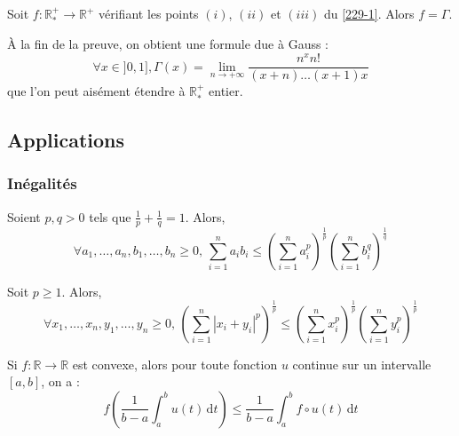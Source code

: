 
	\begin{theorem}
		Soit $f : \mathbb{R}^+_* \rightarrow \mathbb{R}^+$ vérifiant les points $(i)$, $(ii)$ et $(iii)$ du \cref{229-1}. Alors $f = \Gamma$.
	\end{theorem}

	\begin{remark}
		À la fin de la preuve, on obtient une formule due à Gauss :
		\[ \forall x \in ]0, 1], \Gamma(x) = \lim_{n \rightarrow +\infty} \frac{n^x n!}{(x+n) \dots (x+1)x} \]
		que l'on peut aisément étendre à $\mathbb{R}^+_*$ entier.
	\end{remark}

	\subsection{Applications}

	\subsubsection{Inégalités}


	\begin{proposition}
		Soient $p, q > 0$ tels que $\frac{1}{p} + \frac{1}{q} = 1$. Alors,
		\[ \forall a_1, \dots, a_n, b_1, \dots, b_n \geq 0, \, \sum_{i=1}^n a_i b_i \leq \left( \sum_{i=1}^n a_i^p \right)^{\frac{1}{p}} \left( \sum_{i=1}^n b_i^q \right)^{\frac{1}{q}} \]
	\end{proposition}

	\begin{proposition}
		Soit $p \geq 1$. Alors,
		\[ \forall x_1, \dots, x_n, y_1, \dots, y_n \geq 0, \, \left( \sum_{i=1}^n |x_i + y_i|^p \right)^{\frac{1}{p}} \leq \left( \sum_{i=1}^n x_i^p \right)^{\frac{1}{p}} \left( \sum_{i=1}^n y_i^p \right)^{\frac{1}{p}} \]
	\end{proposition}


	\begin{proposition}
		Si $f : \mathbb{R} \rightarrow \mathbb{R}$ est convexe, alors pour toute fonction $u$ continue sur un intervalle $[a, b]$, on a :
		\[ f \left( \frac{1}{b-a} \int_a^b u(t) \, \mathrm{d}t \right) \leq \frac{1}{b-a} \int_a^b f \circ u (t) \, \mathrm{d}t \]
	\end{proposition}

